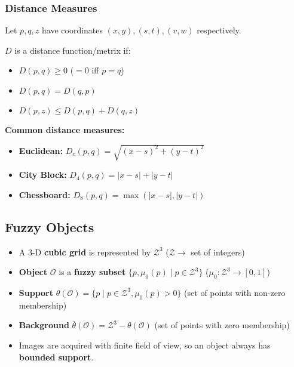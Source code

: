 \subsubsection*{Distance Measures}

Let $p, q, z$ have coordinates $(x, y), (s, t), (v, w)$ respectively.

$D$ is a distance function/metrix if:

\begin{itemize}
  \item $D(p, q) \geq 0$ ($= 0$ iff $p = q$)
  \item $D(p, q) = D(q, p)$
  \item $D(p, z) \leq D(p, q) + D(q, z)$
\end{itemize}

\textbf{Common distance measures:}

\begin{itemize}
  \item \textbf{Euclidean:} $D_e(p, q) = \sqrt{(x - s)^2 + (y - t)^2}$
  \item \textbf{City Block:} $D_4(p, q) = |x - s| + |y - t|$
  \item \textbf{Chessboard:} $D_8(p, q) = \max(|x - s|, |y - t|)$
\end{itemize}

\subsection*{Fuzzy Objects}

\begin{itemize}
  \item A 3-D \textbf{cubic grid} is represented by $\mathcal{Z}^3$
    ($\mathcal{Z} \rightarrow$ set of integers)
  \item \textbf{Object} $\mathcal{O}$ is a \textbf{fuzzy subset}
    $\{p, \mu_0(p) \; | \; p \in \mathcal{Z}^3\}$ ($\mu_0 :
    \mathcal{Z}^3 \rightarrow [0, 1]$)
  \item \textbf{Support} $\theta(\mathcal{O}) = \{p \; | \; p \in
    \mathcal{Z}^3, \mu_0(p) > 0\}$ (set of points with non-zero membership)
  \item \textbf{Background} $\bar{\theta}(\mathcal{O}) =
    \mathcal{Z}^3 - \theta(\mathcal{O})$ (set of points with zero membership)
  \item Images are acquired with finite field of view, so an object
    always has \textbf{bounded support}.
\end{itemize}

